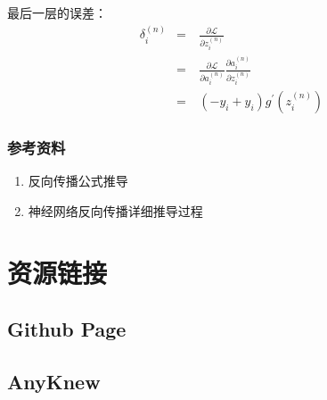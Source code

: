 \documentclass[letterpaper,10pt,english]{sphinxmanual}
\begin{document}
最后一层的误差：
\begin{equation*}
\begin{split}\delta^{(n)}_i & = & \ \frac{\partial{\mathcal{L}}}{\partial{z^{(n)}_i}} \\
               & = & \ \frac{\partial{\mathcal{L}}}{\partial{a^{(n)}_i}} \frac{\partial{a^{(n)}_i}}{\partial{z^{(n)}_i}} \\
               & = & \ (- y_i + \hat{y}_i) g^{\prime}(z^{(n)}_i)\end{split}
\end{equation*}

\subsection{参考资料}
\label{\detokenize{deepLearning/07_backprop:id4}}\begin{enumerate}
\item {} 
反向传播公式推导

\end{enumerate}
\begin{quote}

\end{quote}
\begin{enumerate}
\setcounter{enumi}{1}
\item {} 
神经网络\textendash{}反向传播详细推导过程

\end{enumerate}
\begin{quote}

\end{quote}


\chapter{资源链接}
\label{\detokenize{link/index::doc}}\label{\detokenize{link/index:id1}}

\section{Github Page}
\label{\detokenize{link/index:github-page}}


\section{AnyKnew}
\label{\detokenize{link/index:anyknew}}
\end{document}
